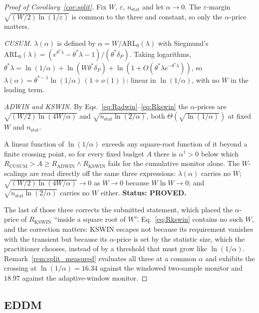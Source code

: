 \begin{proof}[Proof of Corollary~\ref{cor:split}]
  Fix $W$, $\varepsilon$, $n_{\mathrm{stat}}$ and let $\alpha \to 0$. The
  $\varepsilon$-margin $\sqrt{(W/2)\ln(1/\varepsilon)}$ is common to the three
  and constant, so only the $\alpha$-price matters.

  \emph{CUSUM.} $\lambda(\alpha)$ is defined by
  $\alpha = W/\mathrm{ARL}_0(\lambda)$ with Siegmund's
  $\mathrm{ARL}_0(\lambda) = (e^{\theta^* \lambda} - \theta^*\lambda - 1)/
  (\theta^*\delta_P)$. Taking logarithms,
  $\theta^*\lambda = \ln(1/\alpha) + \ln(W\theta^*\delta_P) + \ln(1 +
  O(\theta^*\lambda e^{-\theta^*\lambda}))$, so
  $\lambda(\alpha) = \theta^{*-1}\ln(1/\alpha)\,(1+o(1))$: linear in
  $\ln(1/\alpha)$, with no $W$ in the leading term.

  \emph{ADWIN and KSWIN.} By Eqs.~\eqref{eq:Radwin}--\eqref{eq:Rkswin} the
  $\alpha$-prices are $\sqrt{(W/2)\ln(4W/\alpha)}$ and
  $\sqrt{n_{\mathrm{stat}}\ln(2/\alpha)}$, both
  $\Theta(\sqrt{\ln(1/\alpha)})$ at fixed $W$ and $n_{\mathrm{stat}}$.

  A linear function of $\ln(1/\alpha)$ exceeds any square-root function of it
  beyond a finite crossing point, so for every fixed budget $A$ there is
  $\alpha^\dagger > 0$ below which $R_{\mathrm{CUSUM}} > A \ge
  R_{\mathrm{ADWIN}} \wedge R_{\mathrm{KSWIN}}$ fails for the cumulative monitor
  alone. The $W$-scalings are read directly off the same three expressions:
  $\lambda(\alpha)$ carries no $W$; $\sqrt{(W/2)\ln(4W/\alpha)} \to 0$ as
  $W \to 0$ because $W\ln W \to 0$; and $\sqrt{n_{\mathrm{stat}}\ln(2/\alpha)}$
  carries no $W$ either. \textbf{Status: PROVED.}

  The last of those three corrects the submitted statement, which placed the
  $\alpha$-price of $R_{\mathrm{KSWIN}}$ ``inside a square root of $W$''.
  Eq.~\eqref{eq:Rkswin} contains no such $W$, and the correction matters: KSWIN
  escapes not because its requirement vanishes with the transient but because
  its $\alpha$-price is set by the statistic size, which the practitioner
  chooses, instead of by a threshold that must grow like $\ln(1/\alpha)$.
  Remark~\ref{rem:split_measured} evaluates all three at a common $\alpha$ and
  exhibits the crossing at $\ln(1/\alpha) = 16.34$ against the windowed two-sample 
  monitor and $18.97$ against the adaptive-window monitor.
\end{proof}

\subsection{EDDM}\label{sec:prop3_eddm}

